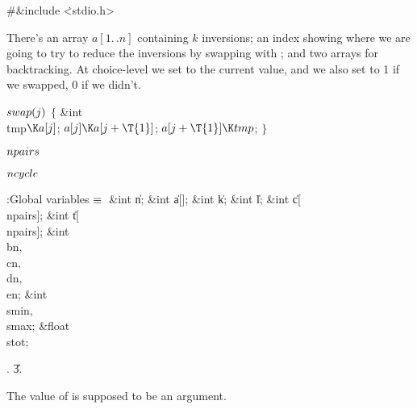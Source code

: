 \Y\B\8\#\&{include} \.{<stdio.h>}\par
\fi

There's an array $a[1\mathrel{.\,.}n]$ containing $k$ inversions; an
index  showing where we are going to try to reduce the inversions
by swapping  with ; and two arrays for
backtracking.
At choice-level  we set  to the current  value,
and
we also set  to 1 if we swapped, 0 if we didn't.

\Y\B\4\D$\\{swap}(\|j)$ \6
${}\{{}$\5
\1\&{int} \\{tmp}${}\K\|a[\|j]{}$;\5
${}\|a[\|j]\K\|a[\|j+\T{1}]{}$;\5
${}\|a[\|j+\T{1}]\K\\{tmp}{}$;\5
${}\}{}$\2\par
\B\4\D$\\{npairs}$ \5
\par
\B\4\D$\\{ncycle}$ \5
\par
\Y\B\4\*:Global variables\X${}\equiv{}$\6
\&{int} \|n;\6
\&{int} \|a[];\6
\&{int} \|k;\6
\&{int} \|l;\6
\&{int} \|c[\\{npairs}];\6
\&{int} \|t[\\{npairs}];\6
\&{int} \\{bn}${},{}$ \\{cn}${},{}$ \\{dn}${},{}$ \\{en};\6
\&{int} \\{smin}${},{}$ \\{smax};\6
\&{float} \\{stot};\par
{}.
\U3\*.\fi

The value of  is supposed to be an argument.

